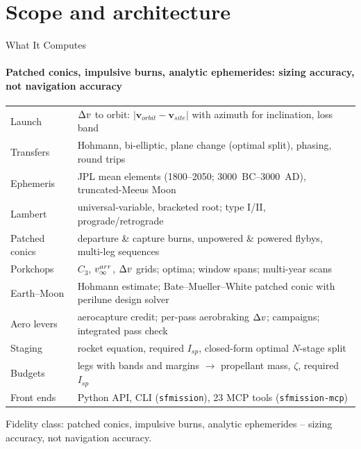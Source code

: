 \documentclass[aspectratio=169,10pt]{beamer}
\newcommand{\code}[1]{\texttt{#1}}
\newcommand{\hl}[1]{\textcolor{PMS7635C}{#1}}
\begin{document}
\section{Scope and architecture}
\begin{frame}{What It Computes}
  \framesubtitle{Patched conics, impulsive burns, analytic ephemerides: sizing accuracy, not navigation accuracy}
\footnotesize
\begin{tabular}{p{}p{}}\toprule
Launch & $\Delta v$ to orbit: $|\bm v_{orbit}-\bm v_{site}|$ with azimuth for inclination, loss band \\
Transfers & Hohmann, bi-elliptic, plane change (optimal split), phasing, round trips \\
Ephemeris & JPL mean elements (1800--2050; 3000~BC--3000~AD), truncated-Meeus Moon \\
Lambert & universal-variable, bracketed root; type I/II, prograde/retrograde \\
Patched conics & departure \& capture burns, unpowered \& powered flybys, multi-leg sequences \\
Porkchops & $C_3$, $v_\infty^{arr}$, $\Delta v$ grids; optima; window spans; multi-year scans \\
Earth--Moon & Hohmann estimate; Bate--Mueller--White patched conic with perilune design solver \\
Aero levers & aerocapture credit; per-pass aerobraking $\Delta v$; campaigns; integrated pass check \\
Staging & rocket equation, required $I_{sp}$, closed-form optimal $N$-stage split \\
Budgets & legs with bands and margins $\rightarrow$ propellant mass, $\zeta$, required $I_{sp}$ \\
Front ends & Python API, CLI (\code{sfmission}), 23 MCP tools (\code{sfmission-mcp}) \\\bottomrule
\end{tabular}
\medskip

\hl{Fidelity class:} patched conics, impulsive burns, analytic ephemerides -- sizing accuracy, not navigation accuracy.
\end{frame}
\end{document}
